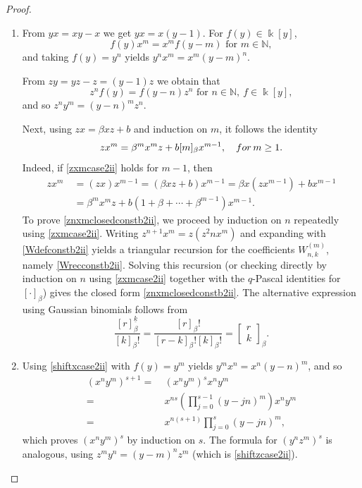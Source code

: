 \documentclass[10pt,a4paper]{amsart}
\begin{document}
\begin{proof}
\begin{enumerate}
    \item [\rm (1)]  From $yx = xy-x$ we get $yx = x(y-1)$. For $f(y)\in\Bbbk[y]$,
\begin{equation}\label{shiftxcase2ii}
f(y)  x^m=x^m f(y-m) \text{ for } m\in\mathbb{N},
\end{equation}        
and taking $f(y) = y^n$ yields $y^n x^m=x^m(y-m)^n$.

From $zy = yz - z = (y-1)z$ we obtain that
\begin{equation}\label{shiftzcase2ii}
z^n f(y)=f(y-n)  z^n\text{ for } n\in\mathbb{N},\ f\in\Bbbk[y],
\end{equation}
and so $z^n y^m = (y - n)^m z^n$.

Next, using $zx = \beta xz+b$ and induction on $m$, it follows the identity
\begin{equation}\label{zxmcase2ii}
z x^m=\beta^m x^m z+b  [m]_\beta  x^{m-1}, \quad {\rm for} \, m\ge 1.
\end{equation}
Indeed, if \eqref{zxmcase2ii} holds for $m-1$, then
\begin{align*}
z x^m &\ =(zx)x^{m-1}=(\beta xz+b)x^{m-1} =\beta x(zx^{m-1})+b x^{m-1} \\
&\ =\beta^m x^m z+b(1+\beta+\cdots+\beta^{m-1})x^{m-1}.
\end{align*}
To prove \eqref{znxmclosedconstb2ii}, we proceed by induction on $n$ repeatedly using \eqref{zxmcase2ii}. Writing $z^{n+1}x^m = z(z^2n x^m)$ and expanding with \eqref{Wdefconstb2ii} yields a triangular recursion for the coefficients $W^{(m)}_{n,k}$, namely \eqref{Wrecconstb2ii}. Solving this recursion (or checking directly
by induction on $n$ using \eqref{zxmcase2ii} together with the $q$-Pascal identities for $[  \cdot  ]_\beta$)
gives the closed form \eqref{znxmclosedconstb2ii}. The alternative expression using Gaussian binomials follows from
\[
\frac{[r]^{\underline{k}}_\beta}{[k]_\beta!}
=\frac{[r]_\beta!}{[r-k]_\beta!  [k]_\beta!}
=\begin{bmatrix} r\\ k\end{bmatrix}_\beta.
\]

\item [\rm (2)] Using \eqref{shiftxcase2ii} with $f(y) = y^m$ yields $y^m x^n = x^n (y-n)^m$, and so
\begin{align*}
  (x^n y^m)^{s+1} = &\ (x^n y^m)^s x^n y^m  \\   
  = &\ x^{ns}\left(\prod_{j=0}^{s-1}(y-jn)^m\right)x^n y^m \\
  = &\ x^{n(s+1)}\prod_{j=0}^{s}(y-jn)^m, 
\end{align*}
which proves $(x^n y^m)^s$ by induction on $s$. The formula for $(y^n z^m)^s$ is analogous, using $z^m y^n = (y - m)^n z^m$ (which is \eqref{shiftzcase2ii}).


\end{enumerate}
\end{proof}
\end{document}
